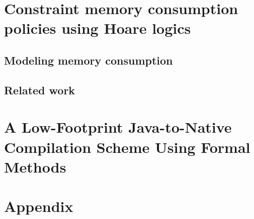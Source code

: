 \documentclass[book,10pt]{book}
\begin{document}
\chapter{Constraint memory consumption policies using Hoare logics}\label{applications:memory}
  
  \lstset{numbers=none}

  \section{Modeling memory consumption}\label{sec:verif}
    
  
  
  
  \section{Related work}\label{sec:rel}
  

\chapter{A Low-Footprint Java-to-Native Compilation Scheme Using Formal Methods}\label{applications:optimComp}
  \lstset{frameround=tttt}
  
  
  
  
  
  
   
   
  
 

%

\appendix
\chapter{Appendix}

    
    

 
\printindex 


\end{document}
